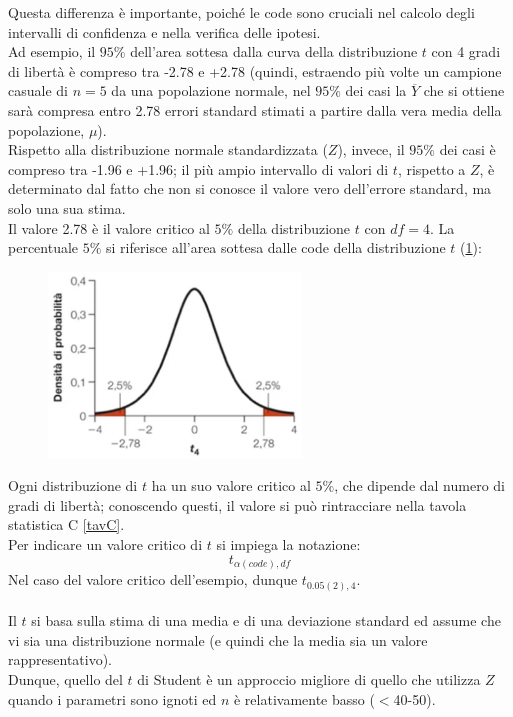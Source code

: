 \documentclass[10pt, draft]{book}
\begin{document}
Questa differenza è importante, poiché le code sono cruciali nel calcolo degli intervalli di confidenza e nella verifica delle ipotesi.
\\
Ad esempio, il $95\%$ dell'area sottesa dalla curva della distribuzione $t$ con 4 gradi di libertà è compreso tra -2.78 e +2.78 (quindi, estraendo più volte un campione casuale di $n = 5$ da una popolazione normale, nel $95\%$ dei casi la $\overline{Y}$ che si ottiene sarà compresa entro 2.78 errori standard stimati a partire dalla vera media della popolazione, $\mu$).
\\
Rispetto alla distribuzione normale standardizzata ($Z$), invece, il $95\%$ dei casi è compreso tra -1.96 e +1.96; il più ampio intervallo di valori di $t$, rispetto a $Z$, è determinato dal fatto che non si conosce il valore vero dell'errore standard, ma solo una sua stima.
\\
Il valore 2.78 è il valore critico al $5\%$ della distribuzione $t$ con $df = 4$. La percentuale $5\%$ si riferisce all'area sottesa dalle code della distribuzione $t$ (\ref{fig11.1-2}):
\begin{figure}[H]\label{fig11.1-2}
    \centering
    \includegraphics[width=0.6\textwidth]{fig11.1-2}
    \caption{\small{}}
    \end{figure}
Ogni distribuzione di $t$ ha un suo valore critico al $5\%$, che dipende dal numero di gradi di libertà; conoscendo questi, il valore si può rintracciare nella tavola statistica C \ref{tavC}.
\\
Per indicare un valore critico di $t$ si impiega la notazione:
\begin{equation}
    t_{\alpha(code),df}
\end{equation}
Nel caso del valore critico dell'esempio, dunque $t_{0.05(2),4}$.
\\
\\
Il $t$ si basa sulla stima di una media e di una deviazione standard ed assume che vi sia una distribuzione normale (e quindi che la media sia un valore rappresentativo).
\\
Dunque, quello del $t$ di Student è un approccio migliore di quello che utilizza $Z$ quando i parametri sono ignoti ed $n$ è relativamente basso ($<$40-50).
\end{document}
